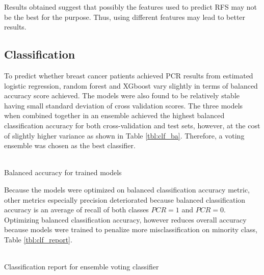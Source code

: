 \documentclass{article}
\begin{document}
Results obtained suggest that possibly the features used to predict RFS may not be the best for the purpose. Thus, using different features may lead to better results.

\subsection{Classification}
To predict whether breast cancer patients achieved PCR results from estimated logistic regression, random forest and XGboost vary slightly in terms of balanced accuracy score achieved. The models were also found to be relatively stable having small standard deviation of cross validation scores. The three models when combined together in an ensemble achieved the highest balanced classification accuracy for both cross-validation and test sets, however, at the cost of slightly higher variance as shown in Table \ref{tbl:clf_ba}. Therefore, a voting ensemble was chosen as the best classifier.
\begin{table}[h]
	\label{tbl:clf_ba}
	\\
	\caption{Balanced accuracy for trained models}
\end{table}

Because the models were optimized on balanced classification accuracy metric, other metrics especially precision deteriorated because balanced classification accuracy is an average of recall of both classes $PCR=1$ and $PCR=0$. Optimizing balanced classification accuracy, however reduces overall accuracy because models were trained to penalize more misclassification on minority class,  Table \ref{tbl:clf_report}.
\begin{table}[h]
	\label{tbl:clf_report}
	\\
	\caption{Classification report for ensemble voting classifier}
\end{table}
\end{document}
